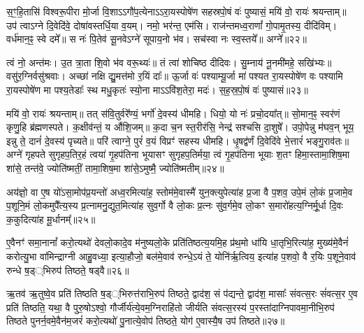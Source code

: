 स॒ꣳ॒हि॒तासि॑ विश्वरू॒पीरा मो॒र्जा वि॒शा\-ऽ\-ऽगौ॑प॒त्येना\-ऽ\-ऽरा॒यस्पोषे॑ण सहस्रपो॒षं वः॑ पुष्यासं॒ मयि॑ वो॒ रायः॑ श्रयन्ताम्॥ उप॑ त्वा\-ऽग्ने दि॒वेदि॑वे॒ दोषा॑वस्तर्धि॒या व॒यम्। नमो॒ भर॑न्त॒ एम॑सि। राज॑न्तमध्व॒राणां᳚ गो॒पामृ॒तस्य॒ दीदि॑विम्। वर्ध॑मान॒ꣴ॒ स्वे दमे᳚॥ स नः॑ पि॒तेव॑ सू॒नवे\-ऽग्ने॑ सूपाय॒नो भ॑व। सच॑स्वा नः स्व॒स्तये᳚॥ अग्ने᳚॥२२॥

त्वं नो॒ अन्त॑मः। उ॒त त्रा॒ता शि॒वो भ॑व वरू॒थ्यः॑॥ तं त्वा॑ शोचिष्ठ दीदिवः। सु॒म्नाय॑ नू॒नमी॑महे॒ सखि॑भ्यः॥ वसु॑र॒ग्निर्वसु॑श्रवाः। अच्छा॑ नक्षि द्यु॒मत्त॑मो र॒यिं दाः᳚॥ ऊ॒र्जा वः॑ पश्याम्यू॒र्जा मा॑ पश्यत रा॒यस्पोषे॑ण वः पश्यामि रा॒यस्पोषे॑ण मा पश्य॒तेडाः᳚ स्थ मधु॒कृतः॑ स्यो॒ना मा\-ऽ\-ऽवि॑श॒तेरा॒ मदः॑। स॒ह॒स्र॒पो॒षं वः॑ पुष्यासं॥२३॥

मयि॑ वो॒ रायः॑ श्रयन्ताम्॥ तत् स॑वि॒तुर्वरे᳚ण्यं॒ भर्गो॑ दे॒वस्य॑ धीमहि। धियो॒ यो नः॑ प्रचो॒दया᳚त्॥ सो॒मान॒ꣴ॒ स्वर॑णं कृणु॒हि ब्र॑ह्मणस्पते। क॒क्षीव॑न्तं॒ य औ॑शि॒जम्॥ क॒दा च॒न स्त॒रीर॑सि॒ नेन्द्र॑ सश्चसि दा॒शुषे᳚। उपो॒पेन्नु म॑घव॒न् भूय॒ इन्नु ते॒ दानं॑ दे॒वस्य॑ पृच्यते॥ परि॑ त्वाग्ने॒ पुरं॑ व॒यं विप्रꣳ॑ सहस्य धीमहि। धृ॒षद्व॑र्णं दि॒वेदि॑वे भे॒त्तारं॑ भङ्गु॒राव॑तः॥ अग्ने॑ गृहपते सुगृहप॒तिर॒हं त्वया॑ गृ॒हप॑तिना भूयासꣳ सुगृहप॒तिर्मया॒ त्वं गृ॒हप॑तिना भूयाः श॒तꣳ हिमा॒स्तामा॒शिष॒मा शा॑से॒ तन्त॑वे॒ ज्योति॑ष्मतीं॒ तामा॒शिष॒मा शा॑से॒\-ऽमुष्मै॒ ज्योति॑ष्मतीम्॥२४॥

{\anuvakamend[{भू॒या॒स्त॒ स्व॒स्तये\-ऽग्ने॑ पुष्यासं धृ॒षद्व॑र्ण॒मेका॒न्नत्रि॒ꣳ॒शच्च॑॥६॥}]}

अय॑ज्ञो॒ वा ए॒ष यो॑\-ऽसा॒मोप॑प्र॒यन्तो॑ अध्व॒रमित्या॑ह॒ स्तोम॑मे॒वास्मै॑ युन॒क्त्युपेत्या॑ह प्र॒जा वै प॒शव॒ उपे॒मं लो॒कं प्र॒जामे॒व प॒शूनि॒मं लो॒कमुपै᳚त्य॒स्य प्र॒त्नामनु॒द्युत॒मित्या॑ह सुव॒र्गो वै लो॒कः प्र॒त्नः सु॑व॒र्गमे॒व लो॒कꣳ स॒मारो॑हत्य॒ग्निर्मू॒र्धा दि॒वः क॒कुदित्या॑ह मू॒र्धानम्᳚॥२५॥

ए॒वैनꣳ॑ समा॒नानां᳚ करो॒त्यथो॑ देवलो॒कादे॒व म॑नुष्यलो॒के प्रति॑तिष्ठत्य॒यमि॒ह प्र॑थ॒मो धा॑यि धा॒तृभि॒रित्या॑ह॒ मुख्य॑मे॒वैनं॑ करोत्यु॒भा वा॑मिन्द्राग्नी आहु॒वध्या॒ इत्या॒हौजो॒ बल॑मे॒वाव॑ रुन्धे॒\-ऽयं ते॒ योनि॑र्\mbox{}ऋ॒त्विय॒ इत्या॑ह प॒शवो॒ वै र॒यिः प॒शूने॒वाव॑ रुन्धे ष॒ड््भिरुप॑ तिष्ठते॒ षड्वै॥२६॥

ऋ॒तव॑ ऋ॒तुष्वे॒व प्रति॑ तिष्ठति ष॒ड््भिरुत्त॑राभि॒रुप॑ तिष्ठते॒ द्वाद॑श॒ सं प॑द्यन्ते॒ द्वाद॑श॒ मासाः᳚ संवत्स॒रः सं॑वत्स॒र ए॒व प्रति॑ तिष्ठति॒ यथा॒ वै पुरु॒षो\-ऽश्वो॒ गौर्जीर्य॑त्ये॒वम॒ग्निराहि॑तो जीर्यति संवत्स॒रस्य॑ प॒रस्ता॑दाग्निपावमा॒नीभि॒रुप॑ तिष्ठते पुनर्न॒वमे॒वैन॑म॒जरं॑ करो॒त्यथो॑ पु॒नात्ये॒वोप॑ तिष्ठते॒ योग॑ ए॒वास्यै॒ष उप॑ तिष्ठते॥२७॥

